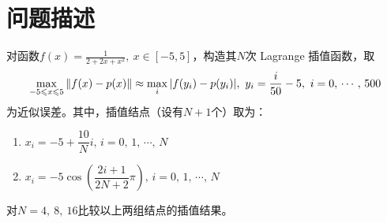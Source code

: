 \documentclass[11pt]{article}
\begin{document}
\maketitle %

\thispagestyle{empty} %

\newpage

\section{问题描述}
对函数$\displaystyle f(x) = \frac{1}{2 + 2x + x^2},\ x \in [-5, 5]$，构造其$N$次 Lagrange 插值函数，取
\begin{equation*}
    \max_{-5 \leqslant x \leqslant 5}{\left \Arrowvert f(x) - p(x)\right \Arrowvert } \approx \max_i{\left\arrowvert f(y_i) - p(y_i)\right\arrowvert},\ y_i = \dfrac{i}{50} - 5,\ i = 0,\, \cdots,\, 500
\end{equation*}
为近似误差。其中，插值结点（设有$N + 1$个）取为：
\begin{enumerate}[label = (\arabic*)]
    \item $x_i = -5 + \dfrac{10}{N}i,\, i = 0,\,1,\,\cdots,\,N$
    \item $x_i = -5\cos{\left(\dfrac{2i + 1}{2N + 2}\pi\right)},\, i = 0,\,1,\,\cdots,\,N$
\end{enumerate}
对$N = 4,\ 8,\ 16$比较以上两组结点的插值结果。
\end{document}
